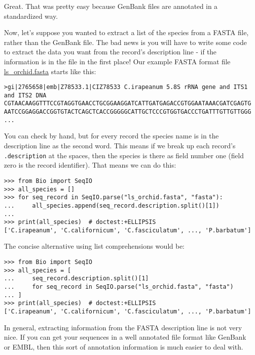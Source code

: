 Great.  That was pretty easy because GenBank files are annotated in a standardized way.

Now, let's suppose you wanted to extract a list of the species from a FASTA file, rather than the GenBank file.  The bad news is you will have to write some code to extract the data you want from the record's description line - if the information is in the file in the first place!  Our example FASTA format file \href{https://raw.githubusercontent.com/biopython/biopython/master/Doc/examples/ls_orchid.fasta}{ls\_orchid.fasta} starts like this:

\begin{verbatim}
>gi|2765658|emb|Z78533.1|CIZ78533 C.irapeanum 5.8S rRNA gene and ITS1 and ITS2 DNA
CGTAACAAGGTTTCCGTAGGTGAACCTGCGGAAGGATCATTGATGAGACCGTGGAATAAACGATCGAGTG
AATCCGGAGGACCGGTGTACTCAGCTCACCGGGGGCATTGCTCCCGTGGTGACCCTGATTTGTTGTTGGG
...
\end{verbatim}

You can check by hand, but for every record the species name is in the description line as the second word.  This means if we break up each record's \verb|.description| at the spaces, then the species is there as field number one (field zero is the record identifier).  That means we can do this:

\begin{verbatim}
>>> from Bio import SeqIO
>>> all_species = []
>>> for seq_record in SeqIO.parse("ls_orchid.fasta", "fasta"):
...     all_species.append(seq_record.description.split()[1])
...
>>> print(all_species)  # doctest:+ELLIPSIS
['C.irapeanum', 'C.californicum', 'C.fasciculatum', ..., 'P.barbatum']
\end{verbatim}

The concise alternative using list comprehensions would be:

\begin{verbatim}
>>> from Bio import SeqIO
>>> all_species = [
...     seq_record.description.split()[1]
...     for seq_record in SeqIO.parse("ls_orchid.fasta", "fasta")
... ]
>>> print(all_species)  # doctest:+ELLIPSIS
['C.irapeanum', 'C.californicum', 'C.fasciculatum', ..., 'P.barbatum']
\end{verbatim}

In general, extracting information from the FASTA description line is not very nice.
If you can get your sequences in a well annotated file format like GenBank or EMBL,
then this sort of annotation information is much easier to deal with.

